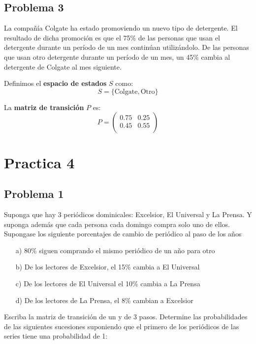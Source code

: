 \documentclass{article}
\begin{document}
\subsection{Problema 3}

La compañía Colgate ha estado promoviendo un nuevo tipo de detergente. El resultado de dicha promoción es que el 75\% de las personas que usan el detergente durante un período de un mes continúan utilizándolo. De las personas que usan otro detergente durante un período de un mes, un 45\% cambia al detergente de Colgate al mes siguiente.


Definimos el \textbf{espacio de estados} \( S \) como:
\[ S = \{ \text{Colgate}, \text{Otro} \} \]

La \textbf{matriz de transición} \( P \) es:
\[
    P = \begin{pmatrix}
        0.75 & 0.25 \\
        0.45 & 0.55 \\
    \end{pmatrix}
\]

\section{Practica 4}

\subsection*{Problema 1}

Suponga que hay 3 periódicos dominicales: Excelsior, El Universal y La Prensa.
Y suponga además que cada persona cada domingo compra solo uno de ellos. Supongase los siguiente porcentajes de cambio de periódico al paso de los años

\begin{itemize}
    \item[a)] 80\% siguen comprando el mismo periódico de un año para otro
    \item[b)] De los lectores de Excelsior, el 15\% cambia a El Universal
    \item[c)] De los lectores de El Universal el 10\% cambia a La Prensa
    \item[d)] De los lectores de La Prensa, el 8\% cambian a Excelsior
\end{itemize}

Escriba la matriz de transición de un y de 3 pasos. Determine las probabilidades de las siguientes sucesiones suponiendo que el primero de los periódicos de las series tiene una probabilidad de 1:
\end{document}
